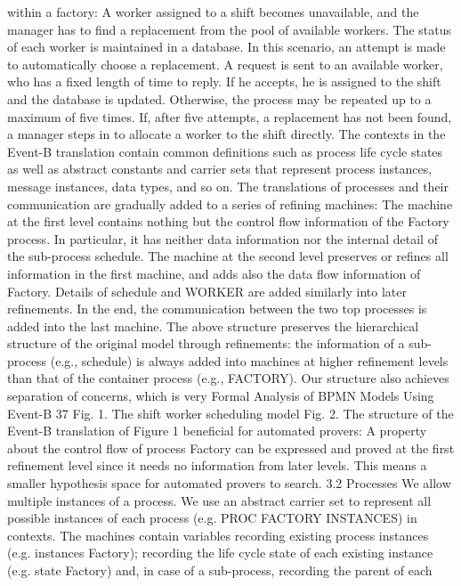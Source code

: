 within a factory: A worker assigned to a shift becomes unavailable, and the
manager has to find a replacement from the pool of available workers. The status
of each worker is maintained in a database. In this scenario, an attempt is made
to automatically choose a replacement. A request is sent to an available worker,
who has a fixed length of time to reply. If he accepts, he is assigned to the shift
and the database is updated. Otherwise, the process may be repeated up to a
maximum of five times. If, after five attempts, a replacement has not been found,
a manager steps in to allocate a worker to the shift directly.
The contexts in the Event-B translation contain common definitions such as
process life cycle states as well as abstract constants and carrier sets that represent process instances, message instances, data types, and so on. The translations
of processes and their communication are gradually added to a series of refining
machines: The machine at the first level contains nothing but the control flow
information of the Factory process. In particular, it has neither data information nor the internal detail of the sub-process schedule. The machine at the
second level preserves or refines all information in the first machine, and adds
also the data flow information of Factory. Details of schedule and WORKER are
added similarly into later refinements. In the end, the communication between
the two top processes is added into the last machine.
The above structure preserves the hierarchical structure of the original model
through refinements: the information of a sub-process (e.g., schedule) is always
added into machines at higher refinement levels than that of the container process
(e.g., FACTORY). Our structure also achieves separation of concerns, which is very
Formal Analysis of BPMN Models Using Event-B 37
Fig. 1. The shift worker scheduling model
Fig. 2. The structure of the Event-B translation of Figure 1
beneficial for automated provers: A property about the control flow of process
Factory can be expressed and proved at the first refinement level since it needs
no information from later levels. This means a smaller hypothesis space for
automated provers to search.
3.2 Processes
We allow multiple instances of a process. We use an abstract carrier set to
represent all possible instances of each process (e.g. PROC FACTORY INSTANCES)
in contexts. The machines contain variables recording existing process instances
(e.g. instances Factory); recording the life cycle state of each existing instance
(e.g. state Factory) and, in case of a sub-process, recording the parent of each
